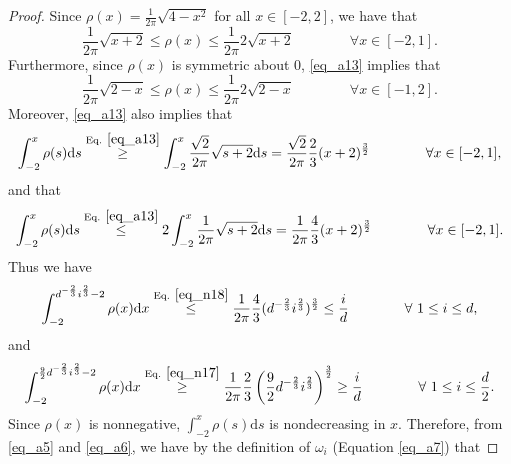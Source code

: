 \documentclass[11pt,letterpaper]{article}
\begin{document}
\begin{proof}
%
%
Since $\rho(x)= \frac{1}{2\pi}\sqrt{4 - x^2}$ for all $x \in [-2,2]$, we have that 
\begin{equation}\label{eq_a13}
    \frac{1}{2\pi} \sqrt{x+2} \leq \rho(x) \leq \frac{1}{2\pi} 2\sqrt{x+2}  \qquad \qquad  \forall x\in[-2,1].
\end{equation}
%
Furthermore, since $\rho(x)$ is symmetric about $0$, \eqref{eq_a13} implies that
\begin{equation}\label{eq_a13b}
    \frac{1}{2\pi}\sqrt{2-x} \leq \rho(x) \leq \frac{1}{2\pi} 2\sqrt{2-x} \qquad \qquad \forall x\in[-1,2].
\end{equation}
%
Moreover, \eqref{eq_a13} also implies that
\begin{equation}\label{eq_n17}
\int_{-2}^x \rho(s) \mathrm{d} s
%
\stackrel{\textrm{Eq. } \eqref{eq_a13}}{\geq} \int_{-2}^x    \frac{\sqrt{2}}{2\pi} \sqrt{s+2} \mathrm{d} s = \frac{\sqrt{2}}{2\pi}  \frac{2}{3}(x+2)^{\frac{3}{2}}   \qquad \qquad  \forall x\in[-2,1],
\end{equation}
%
and that
\begin{equation}\label{eq_n18}
\int_{-2}^x \rho(s) \mathrm{d} s
%
\stackrel{\textrm{Eq. } \eqref{eq_a13}}{\leq} 2\int_{-2}^x    \frac{1}{2\pi} \sqrt{s+2} \mathrm{d} s =  \frac{1}{2\pi}  \frac{4}{3}(x+2)^{\frac{3}{2}}   \qquad \qquad  \forall x\in[-2,1].
\end{equation}
    Thus we have
      \begin{equation}\label{eq_a5}
\int_{-2}^{d^{-\frac{2}{3}} i^{\frac{2}{3}} -2} \rho(x) \mathrm{d} x \stackrel{\textrm{Eq. } \eqref{eq_n18}}{\leq} \frac{1}{2\pi} \frac{4}{3}( d^{-\frac{2}{3}} i^{\frac{2}{3}})^{\frac{3}{2}} \leq \frac{i}{d} \qquad \qquad \forall \ 1\leq i \leq d,
\end{equation}
%
and
      \begin{equation} \label{eq_a6}
\int_{-2}^{\frac{9}{2}d^{-\frac{2}{3}} i^{\frac{2}{3}} -2} \rho(x) \mathrm{d} x \stackrel{\textrm{Eq. } \eqref{eq_n17}}{\geq} \frac{1}{2\pi} \frac{2}{3}\left(\frac{9}{2}d^{-\frac{2}{3}} i^{\frac{2}{3}}\right)^{\frac{3}{2}} \geq \frac{i}{d} \qquad \qquad  \forall \ 1\leq i \leq \frac{d}{2}.
\end{equation}
%
Since $\rho(x)$ is nonnegative, $\int_{-2}^x \rho(s) \mathrm{d} s$ is nondecreasing in $x$.
%
Therefore, from \eqref{eq_a5} and \eqref{eq_a6}, we have by the definition of $\omega_i$ (Equation \eqref{eq_a7}) that


\end{proof}
\end{document}
